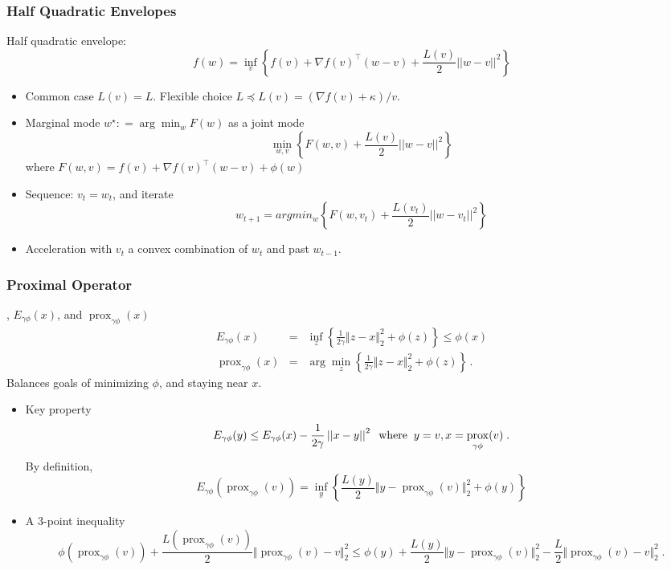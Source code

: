 \documentclass{beamer}
\newcommand{\bcol}[1]{{\color{blue}{#1}}}
\newcommand{\defeq}{\mathrel{\mathop:}=}
\newcommand{\vnorm}[1]{\left|\left|#1\right|\right|}
\newcommand{\enorm}[1]{\Vert #1 \Vert_2}
\newcommand{\prox}{\mathop{\mathrm{prox}}}
\begin{document}
\begin{frame}
\frametitle{Half Quadratic Envelopes}

\footnotesize
Half quadratic envelope:
$$ 
f(w) = \inf_v \left \{ f(v) + \nabla f(v)^\top (w-v) + \frac{L(v)}{2} \vnorm{w-v}^2 \right \} 
$$

\begin{itemize}
\item
Common case $ L(v)=L$. 
Flexible choice $ L \preceq L(v) = ( \nabla f(v) + \kappa ) / v $. 

\item \bcol{ICM Algorithm:}
Marginal mode $ w^\star \defeq \arg \min_w F(w) $ as a joint mode
$$ 
\min_{w,v} \left \{ F(w,v) + \frac{L(v)}{2} \vnorm{w-v}^2  \right \} 
$$
where $F(w,v) =  f(v) + \nabla f(v)^\top ( w- v) + \phi( w ) $
\item 
Sequence: $v_t = w_t$, and iterate
$$
w_{t+1} =  argmin_w \left \{ F(w , v_t ) + \frac{L(v_t)}{2} \vnorm{w-v_t}^2 \right \} 
$$
\item
Acceleration with $v_t$ a convex combination of $w_t$ and past $ w_{t-1} $.
\end{itemize}

\end{frame}
\begin{frame}
  \frametitle{Proximal Operator}

  \footnotesize
  \bcol{Moreau envelope}, $E_{\gamma \phi}(x)$, and \bcol{proximal operator} $\prox_{\gamma \phi} (x)$ 
  \begin{eqnarray*}
  E_{\gamma \phi} (x) &=& \inf_{z } \left\{\frac{1}{2\gamma} \enorm{z - x}^2  + \phi(z)  \right\}  \leq \phi(x) \\
  \prox_{\gamma \phi} (x) &=& \arg \min_{z } \left\{ \frac{1}{2\gamma} \enorm{z - x}^2  + \phi(z)  \right\} \, .
  \end{eqnarray*}
  Balances goals of minimizing $\phi$, and staying near $x$.  

  \begin{itemize}
  \item Key property
  $$
  E_{\gamma \phi} (y) \leq E_{\gamma \phi} (x) - \frac{1}{2 \gamma} \vnorm{x - y}^2 \; \; {\rm where} \; \;  y=v, x=  \prox_{\gamma \phi} (v) \; .
  $$
  By definition, 
  $$  E_{\gamma \phi} \left (\prox_{\gamma \phi} (v) \right ) = \inf_y \left \{ \frac{L(y)}{2} \enorm{y - \prox_{\gamma \phi} (v)}^2 
   + \phi(y) \right \} $$ 
  \item A $3$-point inequality
  \tiny
  $$
  \phi \left ( \prox_{\gamma \phi} (v) \right ) + \frac{L(\prox_{\gamma \phi} (v) )}{2} \enorm{\prox_{\gamma \phi} (v) - v}^2 \leq \phi ( y ) 
  + \frac{L(y)}{2} \enorm{y - \prox_{\gamma \phi} (v)}^2 
   - \frac{L}{2} \enorm{\prox_{\gamma \phi} (v) - v}^2 \; .
  $$
  \end{itemize}

\end{frame}
\end{document}
